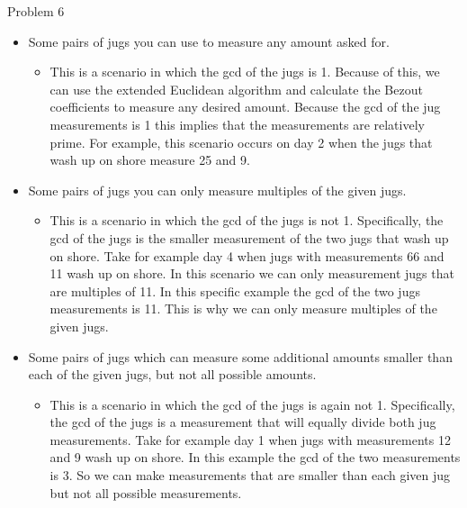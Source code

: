 \begin{problem}{Problem 6}
    \begin{highlight}[Solution]
        \begin{itemize}
            \item Some pairs of jugs you can use to measure any amount asked for.
            \begin{itemize}
                \item This is a scenario in which the gcd of the jugs is 1. Because of this, we can use the extended Euclidean algorithm and calculate the Bezout coefficients to measure any desired
                amount. Because the gcd of the jug measurements is 1 this implies that the measurements are relatively prime. For example, this scenario occurs on day 2 when the jugs that wash up on
                shore measure 25 and 9.
            \end{itemize}
            \item Some pairs of jugs you can only measure multiples of the given jugs.
            \begin{itemize}
                \item This is a scenario in which the gcd of the jugs is not 1. Specifically, the gcd of the jugs is the smaller measurement of the two jugs that wash up on shore. Take for example
                day 4 when jugs with measurements 66 and 11 wash up on shore. In this scenario we can only measurement jugs that are multiples of 11. In this specific example the gcd of the two jugs
                measurements is 11. This is why we can only measure multiples of the given jugs.
            \end{itemize}
            \item Some pairs of jugs which can measure some additional amounts smaller than each of the given jugs, but not all possible amounts.
            \begin{itemize}
                \item This is a scenario in which the gcd of the jugs is again not 1. Specifically, the gcd of the jugs is a measurement that will equally divide both jug measurements. Take for example
                day 1 when jugs with measurements 12 and 9 wash up on shore. In this example the gcd of the two measurements is 3. So we can make measurements that are smaller than each given jug but
                not all possible measurements.
            \end{itemize}
        \end{itemize}
    \end{highlight}
\end{problem}

